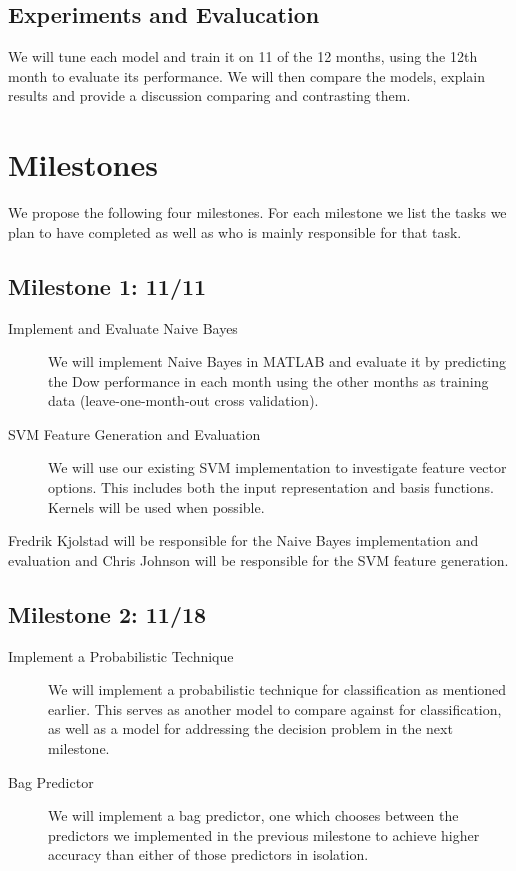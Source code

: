 \documentclass[10pt]{article}
\begin{document}
\subsection{Experiments and Evalucation}
We will tune each model and train it on 11 of the 12 months, using the 12th month to evaluate its performance.
We will then compare the models, explain results and provide a discussion comparing and contrasting them.

\section{Milestones}
We propose the following four milestones. For each milestone we list the tasks we plan to have completed as well as who is mainly responsible for that task.

\subsection{Milestone 1: 11/11}

\begin{description}
\item[Implement and Evaluate Naive Bayes] We will implement Naive Bayes in MATLAB and evaluate it by predicting the Dow performance in each month using the other months as training data (leave-one-month-out cross validation).
\item[SVM Feature Generation and Evaluation] We will use our existing SVM implementation to investigate feature vector options. This includes both the input representation and basis functions. Kernels will be used when possible.

\end{description}

Fredrik Kjolstad will be responsible for the Naive Bayes implementation and evaluation and Chris Johnson will be responsible for the SVM feature generation.


\subsection{Milestone 2: 11/18}

\begin{description}
\item[Implement a Probabilistic Technique] We will implement a probabilistic technique for classification as mentioned earlier. This serves as another model to compare against for classification, as well as a model for addressing the decision problem in the next milestone.
\item[Bag Predictor] We will implement a bag predictor, one which chooses between the predictors we implemented in the previous milestone to achieve higher accuracy than either of those predictors in isolation. 
\end{description}
\end{document}
